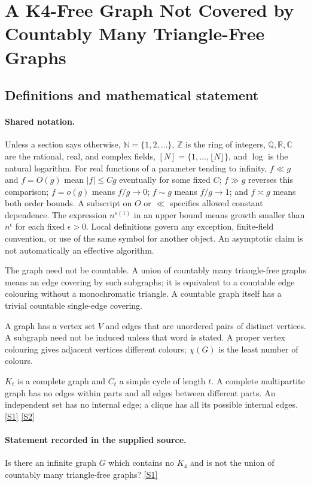 \documentclass[11pt,a4paper]{article}
\newcommand{\N}{\mathbb{N}}
\newcommand{\Z}{\mathbb{Z}}
\newcommand{\Q}{\mathbb{Q}}
\newcommand{\R}{\mathbb{R}}
\newcommand{\C}{\mathbb{C}}
\newcommand{\sref}[2]{\hyperlink{source:#1:#2}{[S#2]}}
\begin{document}
\section{A K4-Free Graph Not Covered by Countably Many Triangle-Free Graphs}\label{statement}


\subsection{Definitions and mathematical statement}

\paragraph{Shared notation.}Unless a section says otherwise, $\N=\{1,2,\ldots\}$,
$\Z$ is the ring of integers, $\Q,\R,\C$ are the rational, real, and complex
fields, $[N]=\{1,\ldots,\lfloor N\rfloor\}$, and $\log$ is the natural
logarithm. For real functions of a parameter tending to infinity,
$f\ll g$ and $f=O(g)$ mean $|f|\leq Cg$ eventually for some fixed $C$;
$f\gg g$ reverses this comparison; $f=o(g)$ means $f/g\to0$;
$f\sim g$ means $f/g\to1$; and $f\asymp g$ means both order bounds.
A subscript on $O$ or $\ll$ specifies allowed constant dependence.
The expression $n^{o(1)}$ in an upper bound means growth smaller than
$n^\epsilon$ for each fixed $\epsilon>0$. Local definitions govern any
exception, finite-field convention, or use of the same symbol for another
object. An asymptotic claim is not automatically an effective algorithm.



The graph need not be countable. A union of countably many triangle-free graphs means an edge covering by such subgraphs; it is equivalent to a countable edge colouring without a monochromatic triangle. A countable graph itself has a trivial countable single-edge covering.

A graph has a vertex set $V$ and edges that are unordered pairs of distinct vertices. A subgraph need not be induced unless that word is stated. A proper vertex colouring gives adjacent vertices different colours; $\chi(G)$ is the least number of colours.

$K_t$ is a complete graph and $C_t$ a simple cycle of length $t$. A complete multipartite graph has no edges within parts and all edges between different parts. An independent set has no internal edge; a clique has all its possible internal edges. \sref{statement}{1} \sref{statement}{2}

\paragraph{Statement recorded in the supplied source.}
Is there an infinite graph $G$ which contains no $K_4$ and is not the union of countably many triangle-free graphs? \sref{statement}{1}
\end{document}
